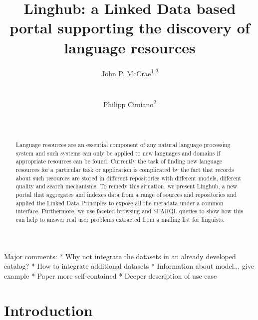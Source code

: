 \documentclass{acm_proc_article-sp}
\begin{document}
\title{Linghub: a Linked Data based portal supporting the discovery of language
resources}

\author{
\alignauthor
John P. McCrae\textsuperscript{1,2}\\
       \\
       \\
\alignauthor
Philipp Cimiano\textsuperscript{2}\\
       \\
       \\
   }

\maketitle
\begin{abstract}
    Language resources are an essential component of any natural language
    processing system and such systems can only be applied to new languages and
    domains if appropriate resources can be found. Currently the task of finding
    new language resources for a particular task or application is complicated by the fact that records about such
    resources are
    stored in different repositories with different models, different quality
    and search mechanisms. To remedy this situation, we present Linghub, a new
    portal that aggregates and indexes data
    from a range of sources and repositories and applied the Linked Data
    Principles to expose all the metadata under a
    common interface. Furthermore, we use faceted browsing and SPARQL queries to
    show how this can help to answer real user problems extracted from a mailing
    list for linguists.
\end{abstract}

Major comments:
* Why not integrate the datasets in an already developed catalog?
* How to integrate additional datasets
* Information about model... give example
* Paper more self-contained
* Deeper description of use case


\section{Introduction}
\end{document}
